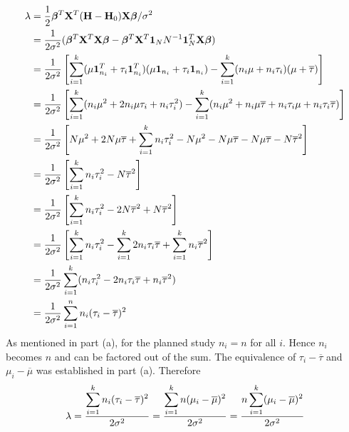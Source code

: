 \begin{align*}
\lambda&={1\over2}\bm\beta^T\mathbf X^T
(\mathbf H-\mathbf H_0)\mathbf X\bm\beta/\sigma^2\\
&=
{1\over2\sigma^2}(
\bm\beta^T\mathbf X^T\mathbf X\bm\beta
-\bm\beta^T\mathbf X^T\mathbf 1_NN^{-1}
\mathbf 1_N^T\mathbf X\bm\beta)\\
&=
{1\over2\sigma^2}\left[
\sum_{i=1}^k
(\mu\mathbf 1_{n_i}^T+\tau_i\mathbf 1_{n_i}^T)
(\mu\mathbf 1_{n_i}+\tau_i\mathbf 1_{n_i})-
\sum_{i=1}^k(n_i\mu+n_i\tau_i)(\mu+\overline{\tau})
\right]\\
&=
{1\over2\sigma^2}\left[
\sum_{i=1}^k(n_i\mu^2+2n_i\mu\tau_i+n_i\tau_i^2)
-\sum_{i=1}^k(n_i\mu^2+n_i\mu\overline{\tau}+n_i\tau_i\mu
+n_i\tau_i\overline{\tau})
\right]\\
&=
{1\over2\sigma^2}\left[
N\mu^2+2N\mu\overline{\tau}+\sum_{i=1}^kn_i\tau_i^2
-N\mu^2-N\mu\overline{\tau}-N\mu\overline{\tau}
-N\overline{\tau}^2
\right]\\
&=
{1\over2\sigma^2}\left[
\sum_{i=1}^kn_i\tau_i^2-N\overline{\tau}^2
\right]\\
&=
{1\over2\sigma^2}\left[
\sum_{i=1}^kn_i\tau_i^2-2N\overline{\tau}^2+N\overline{\tau}^2
\right]\\
&=
{1\over2\sigma^2}\left[
\sum_{i=1}^kn_i\tau_i^2
-\sum_{i=1}^k2n_i\tau_i\overline{\tau}
+\sum_{i=1}^kn_i\overline{\tau}^2
\right]\\
&=
{1\over2\sigma^2}\sum_{i=1}^k
(n_i\tau_i^2-2n_i\tau_i\overline{\tau}+n_i\overline{\tau}^2)\\
&=
{1\over2\sigma^2}\sum_{i=1}^nn_i(\tau_i-\overline{\tau})^2
\end{align*}
As mentioned in part (a), for the planned study $n_i=n$ for all $i$.
Hence $n_i$ becomes $n$ and can be factored out of the sum.
The equivalence of $\tau_i-\overline{\tau}$ and
$\mu_i-\overline{\mu}$ was established in part (a).
Therefore
\[
\lambda
=
{\displaystyle\sum_{i=1}^kn_i(\tau_i-\overline{\tau})^2\over2\sigma^2}
=
{\displaystyle\sum_{i=1}^kn(\mu_i-\overline{\mu})^2\over2\sigma^2}
=
{\displaystyle n\sum_{i=1}^k(\mu_i-\overline{\mu})^2\over2\sigma^2}
\]

